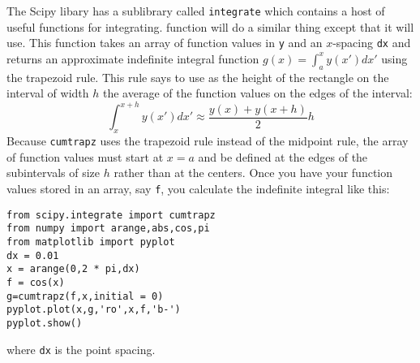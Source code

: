 The Scipy libary has a sublibrary called {\tt integrate} which
contains a host of useful functions for integrating.  function will do a similar thing except that it
will use.
 This function takes an array of function
values in {\tt y} and an $x$-spacing {\tt dx} and returns an approximate
indefinite integral function $g(x)=\int_a^x y(x') dx'$ using the trapezoid
rule. This rule says to use as the height of the rectangle on the interval of
width $h$ the average of the function values on the edges of the interval:
\begin{equation}
\int_x^{x+h} y(x') dx' \approx \frac{y(x)+y(x+h) }{ 2} h
\end{equation}
Because \texttt{cumtrapz} uses the trapezoid rule instead of the midpoint
rule, the array of function values must start at $x=a$ and be defined at the
edges of the subintervals of size $h$ rather than at the centers.  Once you
have your function values stored in an array, say \texttt{f}, you calculate
the indefinite integral like this:
\begin{Verbatim}
from scipy.integrate import cumtrapz
from numpy import arange,abs,cos,pi
from matplotlib import pyplot
dx = 0.01
x = arange(0,2 * pi,dx)
f = cos(x)
g=cumtrapz(f,x,initial = 0)
pyplot.plot(x,g,'ro',x,f,'b-')
pyplot.show()
\end{Verbatim}
where \texttt{dx} is the point spacing.

